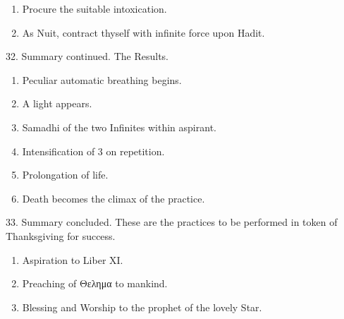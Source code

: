 \begin{enumerate}[leftmargin=4\parindent]
\item Procure the suitable intoxication.
\item As Nuit, contract thyself with infinite force upon Hadit.
\end{enumerate}

32. Summary continued. The Results.
\begin{enumerate}[leftmargin=4\parindent]
\item Peculiar automatic breathing begins.
\item A light appears.
\item Samadhi of the two Infinites within aspirant.
\item Intensification of 3 on repetition.
\item Prolongation of life.
\item Death becomes the climax of the practice.
\end{enumerate}

33. Summary concluded. These are the practices to be performed in token of Thanksgiving for success.
\begin{enumerate}[leftmargin=4\parindent]
\item Aspiration to Liber XI.
\item Preaching of \textgreek{Θελημα} to mankind.
\item Blessing and Worship to the prophet of the lovely Star.
\end{enumerate}
